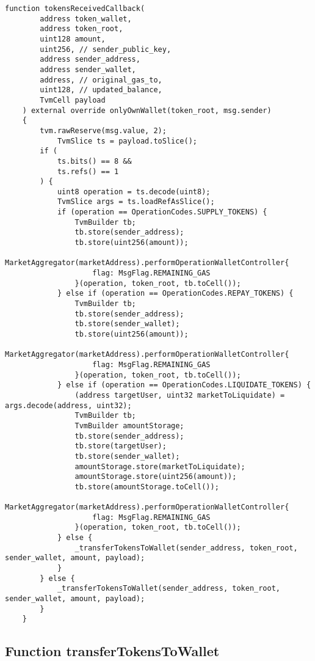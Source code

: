 \begin{lstlisting}[firstnumber=218]
    function tokensReceivedCallback(
        address token_wallet,
        address token_root,
        uint128 amount,
        uint256, // sender_public_key,
        address sender_address,
        address sender_wallet,
        address, // original_gas_to,
        uint128, // updated_balance,
        TvmCell payload
    ) external override onlyOwnWallet(token_root, msg.sender) 
    {
        tvm.rawReserve(msg.value, 2);
            TvmSlice ts = payload.toSlice();
        if (
            ts.bits() == 8 &&
            ts.refs() == 1
        ) {
            uint8 operation = ts.decode(uint8);
            TvmSlice args = ts.loadRefAsSlice();
            if (operation == OperationCodes.SUPPLY_TOKENS) {
                TvmBuilder tb;
                tb.store(sender_address);
                tb.store(uint256(amount));
                MarketAggregator(marketAddress).performOperationWalletController{
                    flag: MsgFlag.REMAINING_GAS
                }(operation, token_root, tb.toCell());
            } else if (operation == OperationCodes.REPAY_TOKENS) {
                TvmBuilder tb;
                tb.store(sender_address);
                tb.store(sender_wallet);
                tb.store(uint256(amount));
                MarketAggregator(marketAddress).performOperationWalletController{
                    flag: MsgFlag.REMAINING_GAS
                }(operation, token_root, tb.toCell());
            } else if (operation == OperationCodes.LIQUIDATE_TOKENS) {
                (address targetUser, uint32 marketToLiquidate) = args.decode(address, uint32);
                TvmBuilder tb;
                TvmBuilder amountStorage;
                tb.store(sender_address);
                tb.store(targetUser);
                tb.store(sender_wallet);
                amountStorage.store(marketToLiquidate);
                amountStorage.store(uint256(amount));
                tb.store(amountStorage.toCell());
                MarketAggregator(marketAddress).performOperationWalletController{
                    flag: MsgFlag.REMAINING_GAS
                }(operation, token_root, tb.toCell());
            } else {
                _transferTokensToWallet(sender_address, token_root, sender_wallet, amount, payload);
            }
        } else {
            _transferTokensToWallet(sender_address, token_root, sender_wallet, amount, payload);
        }
    }
\end{lstlisting}

\subsection{Function transferTokensToWallet}

